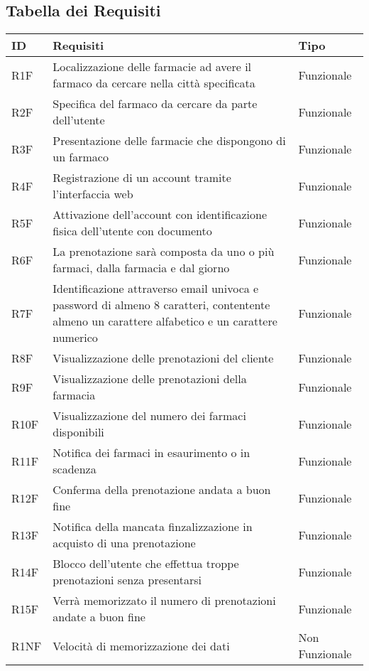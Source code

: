 \subsection{Tabella dei Requisiti}

\begin{tabular} {|P{1.5cm}|P{12.5cm}|P{3cm}|}
\hline
  \textbf{ID} & \textbf{Requisiti} & \textbf{Tipo} \\
\hline
  R1F & Localizzazione delle farmacie ad avere il farmaco da cercare nella città specificata & Funzionale \\
\hline
  R2F & Specifica del farmaco da cercare da parte dell'utente & Funzionale \\
\hline
  R3F & Presentazione delle farmacie che dispongono di un farmaco & Funzionale \\
\hline 
  R4F & Registrazione di un account tramite l'interfaccia web & Funzionale\\
\hline
  R5F & Attivazione dell'account con identificazione fisica dell'utente con documento & Funzionale \\
\hline
  R6F & La prenotazione sarà composta da uno o più farmaci, dalla farmacia e dal giorno & Funzionale\\
\hline
  R7F & Identificazione attraverso email univoca e password di almeno 8 caratteri, contentente almeno un carattere alfabetico e un carattere numerico & Funzionale\\
\hline
  R8F & Visualizzazione delle prenotazioni del cliente & Funzionale\\
\hline
  R9F & Visualizzazione delle prenotazioni della farmacia & Funzionale\\
\hline
  R10F & Visualizzazione del numero dei farmaci disponibili & Funzionale\\
\hline
  R11F & Notifica dei farmaci in esaurimento o in scadenza & Funzionale\\
\hline
  R12F & Conferma della prenotazione andata a buon fine & Funzionale\\
\hline
  R13F & Notifica della mancata finzalizzazione in acquisto di una prenotazione & Funzionale\\
\hline
  R14F & Blocco dell'utente che effettua troppe prenotazioni senza presentarsi & Funzionale\\
\hline
  R15F & Verrà memorizzato il numero di prenotazioni andate a buon fine & Funzionale\\
\hline
  R1NF & Velocità di memorizzazione dei dati & Non Funzionale\\
\hline

\end{tabular}
